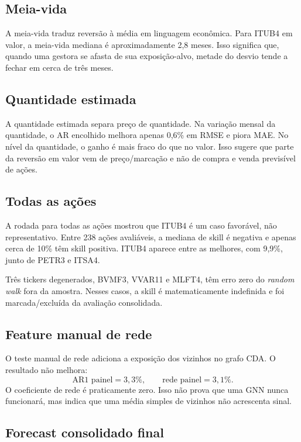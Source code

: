 \documentclass[11pt,a4paper]{article}
\begin{document}
\subsection{Meia-vida}

A meia-vida traduz reversão à média em linguagem econômica. Para ITUB4 em valor, a meia-vida mediana é
aproximadamente 2,8 meses. Isso significa que, quando uma gestora se afasta de sua exposição-alvo, metade do
desvio tende a fechar em cerca de três meses.

\subsection{Quantidade estimada}

A quantidade estimada separa preço de quantidade. Na variação mensal da quantidade, o AR encolhido melhora
apenas 0,6\% em RMSE e piora MAE. No nível da quantidade, o ganho é mais fraco do que no valor. Isso sugere
que parte da reversão em valor vem de preço/marcação e não de compra e venda previsível de ações.

\subsection{Todas as ações}

A rodada para todas as ações mostrou que ITUB4 é um caso favorável, não representativo. Entre 238 ações
avaliáveis, a mediana de skill é negativa e apenas cerca de 10\% têm skill positiva. ITUB4 aparece entre as
melhores, com 9,9\%, junto de PETR3 e ITSA4.

Três tickers degenerados, BVMF3, VVAR11 e MLFT4, têm erro zero do \emph{random walk} fora da amostra. Nesses
casos, a skill é matematicamente indefinida e foi marcada/excluída da avaliação consolidada.

\subsection{Feature manual de rede}

O teste manual de rede adiciona a exposição dos vizinhos no grafo CDA. O resultado não melhora:
\[
\text{AR1 painel}=3,3\%,\qquad \text{rede painel}=3,1\%.
\]
O coeficiente de rede é praticamente zero. Isso não prova que uma GNN nunca funcionará, mas indica que uma
média simples de vizinhos não acrescenta sinal.

\subsection{Forecast consolidado final}
\end{document}
